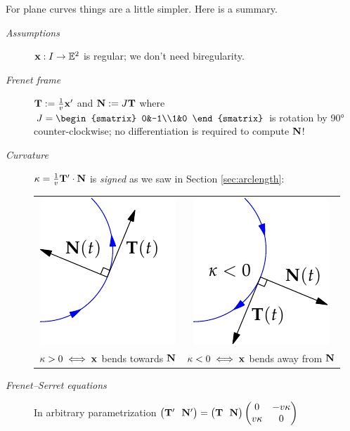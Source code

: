 For plane curves things are a little simpler. Here is a summary. 
\begin{description}
	\item[\normalfont\emph{Assumptions}] ${\mathbf{x}}:I\to\mathbb{E}^2$ is regular; we don't need biregularity.
	
	\item[\normalfont\emph{Frenet frame}] ${\mathbf{T}}:=\frac 1{v}{\mathbf{x}}'$ and ${\mathbf{N}}:=J{\mathbf{T}}$ where $J=\begin{smatrix}
		0&-1\\1&0	
	\end{smatrix}$ is rotation by \ang{90} counter-clockwise; no differentiation is required to compute ${\mathbf{N}}$!
	
	\item[\normalfont\emph{Curvature}] $\kappa=\frac 1v{\mathbf{T}}'\cdot{\mathbf{N}}$ is \emph{signed} as we saw in Section \ref{sec:arclength}:
	\begin{center}
		\begin{tabular}{c@{\qquad\qquad}c}
			\includegraphics{fund-e2}&\includegraphics{fund-e2a}\\
			$\kappa>0\iff {\mathbf{x}}$ bends towards ${\mathbf{N}}$
			&
			$\kappa<0\iff {\mathbf{x}}$ bends away from ${\mathbf{N}}$
		\end{tabular}
	\end{center}
	
	\item[\normalfont\emph{Frenet--Serret equations}] In arbitrary parametrization
	$\bigl(\vT'\ \ \vN'\bigr)
  =
	\bigl(\vT\ \ \vN\bigr)
	\begin{pmatrix}
		0&-v\kappa\\
		v\kappa&0
	\end{pmatrix}
	$
	

\end{description}
